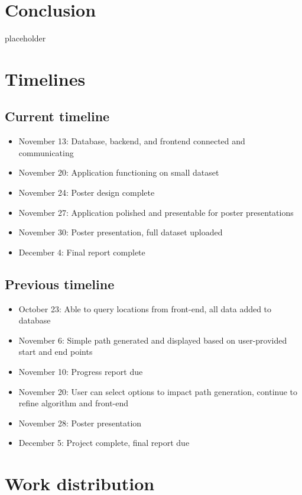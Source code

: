 \documentclass[sigconf]{acmart}
\begin{document}
\section{Conclusion}

placeholder
\appendix
\section{Timelines}
\subsection{Current timeline}

\begin{itemize}
	\item November 13: Database, backend, and frontend connected and communicating
	\item November 20: Application functioning on small dataset
	\item November 24: Poster design complete
	\item November 27: Application polished and presentable for poster presentations
	\item November 30: Poster presentation, full dataset uploaded
	\item December 4: Final report complete
\end{itemize}

\subsection{Previous timeline}
\begin{itemize}
	\item October 23: Able to query locations from front-end, all data added to database
	\item November 6: Simple path generated and displayed based on user-provided start and end points
	\item November 10: Progress report due
	\item November 20: User can select options to impact path generation, continue to refine algorithm and front-end
	\item November 28: Poster presentation
	\item December 5: Project complete, final report due
\end{itemize}

\section{Work distribution}
\end{document}
